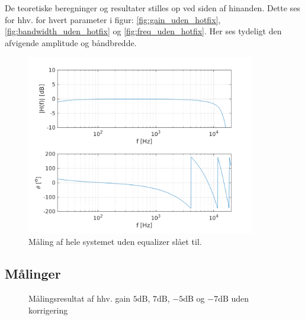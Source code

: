 De teoretiske beregninger og resultater stilles op ved siden af hinanden.
Dette ses for hhv. for hvert parameter i figur: \ref{fig:gain_uden_hotfix}, \ref{fig:bandwidth_uden_hotfix} og \ref{fig:freq_uden_hotfix}. 
Her ses tydeligt den afvigende amplitude og båndbredde.

\begin{figure}[h!]
	\centering
	\includegraphics[width=10cm]{matlabdemo/test/test_eq_off.png}  
	\caption{Måling af hele systemet uden equalizer slået til.}
	\label{fig:eq_off1}
\end{figure}

\subsection{Målinger}

\begin{figure}[h!]
	\centering
  	\caption{Målingsresultat af hhv. gain $5\si{\dB}$, $7\si{\dB}$, $-5\si{\dB}$ og $-7\si{\dB}$ uden korrigering}
	\label{fig:gain}
\end{figure}

